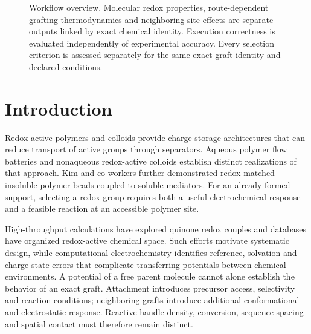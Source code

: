 \documentclass[11pt]{article}
\begin{document}
\begin{figure}[htbp]
\centering
{}
\caption{Workflow overview. Molecular redox properties, route-dependent grafting thermodynamics and neighboring-site effects are separate outputs linked by exact chemical identity. Execution correctness is evaluated independently of experimental accuracy. Every selection criterion is assessed separately for the same exact graft identity and declared conditions.}
\label{fig:workflow}
\end{figure}

\section{Introduction}
Redox-active polymers and colloids provide charge-storage architectures that can reduce transport of active groups through separators. Aqueous polymer flow batteries and nonaqueous redox-active colloids establish distinct realizations of that approach.\cite{janoschka2015,montoto2016} Kim and co-workers further demonstrated redox-matched insoluble polymer beads coupled to soluble mediators.\cite{kim2022} For an already formed support, selecting a redox group requires both a useful electrochemical response and a feasible reaction at an accessible polymer site.

High-throughput calculations have explored quinone redox couples and databases have organized redox-active chemical space.\cite{er2015,d3tales2023} Such efforts motivate systematic design, while computational electrochemistry identifies reference, solvation and charge-state errors that complicate transferring potentials between chemical environments.\cite{marenich2014,fc2010,elhajj2024} A potential of a free parent molecule cannot alone establish the behavior of an exact graft. Attachment introduces precursor access, selectivity and reaction conditions; neighboring grafts introduce additional conformational and electrostatic response. Reactive-handle density, conversion, sequence spacing and spatial contact must therefore remain distinct.
\end{document}
